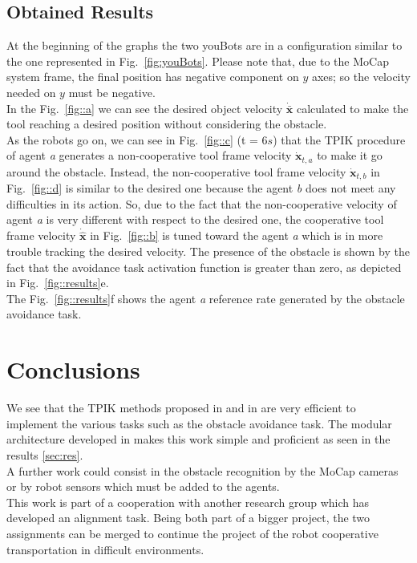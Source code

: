 \documentclass[a4paper, 12pt, notitlepage]{article}
\begin{document}
\begin{multicols}{2}
		\subsection{Obtained Results}
		At the beginning of the graphs the two youBots are in a configuration similar to the one represented in Fig.\ \ref{fig:youBots}. Please note that, due to the MoCap system frame, the final position has negative component on $y$ axes; so the velocity needed on $y$ must be negative.\\
		In the Fig.\ \ref{fig::a} we can see the desired object velocity $\dot{\bar{\boldsymbol{x}}}$ calculated to make the tool reaching a desired position without considering the obstacle.\\
		As the robots go on, we can see in Fig.\ \ref{fig::c} (t = 6$s$) that the TPIK procedure of agent \textit{a} generates a non-cooperative tool frame velocity $\dot{\boldsymbol{x}}_{t,a}$ to make it go around the obstacle. Instead, the non-cooperative tool frame velocity $\dot{\boldsymbol{x}}_{t,b}$ in Fig.\ \ref{fig::d} is similar to the desired one because the agent \textit{b} does not meet any difficulties in its action.
		So, due to the fact that the non-cooperative velocity of agent \textit{a} is very different with respect to the desired one, the cooperative tool frame velocity $\dot{\hat{\boldsymbol{x}}}$ in Fig.\ \ref{fig::b} is tuned toward the agent \textit{a} which is in more trouble tracking the desired velocity. The presence of the obstacle is shown by the fact that the avoidance task activation function is greater than zero, as depicted in Fig.\ \ref{fig::results}\color{blue}e\color{black}.\\ 
		The Fig.\ \ref{fig::results}\color{blue}f \color{black} shows the agent \textit{a} reference rate generated by the obstacle avoidance task.
		
		\section{Conclusions} \label{sec:conc}
		We see that the TPIK methods proposed in \cite{tpik} and in \cite{coopcasa} are very efficient to implement the various tasks such as the obstacle avoidance task. The modular architecture developed in \cite{wander} makes this work simple and proficient as seen in the results \ref{sec:res}. \\
		\hspace*{7px}A further work could consist in the obstacle recognition by the MoCap cameras or by robot sensors which must be added to the agents. \\
		\hspace*{7px}This work is part of a cooperation with another research group which has developed an alignment task. Being both part of a bigger project, the two assignments can be merged to continue the project of the robot cooperative transportation in difficult environments. 


\end{multicols}
\end{document}
